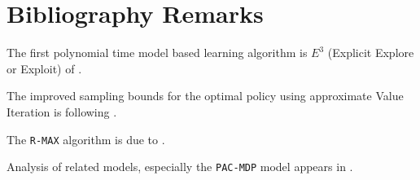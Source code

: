 \section{Bibliography Remarks}


The first polynomial time model based learning algorithm is $E^3$
(Explicit Explore or Exploit) of \cite{KearnsS02}. 

The improved sampling bounds for the optimal policy using
approximate Value Iteration is following \cite{KearnsS98a}.

The {\tt R-MAX} algorithm is due to \cite{BrafmanT02}.

Analysis of related models, especially the {\tt PAC-MDP} model
appears in \cite{StrehlLL09,Li2012}.
